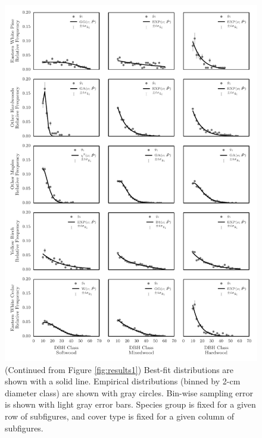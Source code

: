\documentclass{article}
\begin{document}
\begin{figure}[h!]%
  \centering
  \includegraphics[width=1.0\textwidth]{images/pspdistfit_fitplot1}
  \caption{(Continued from Figure \ref{fig:results1}) Best-fit distributions are shown with a solid
    line. Empirical distributions (binned by 2-cm diameter class) are shown with gray circles. Bin-wise sampling error is shown with light gray error bars. Species group is fixed for a given row of
    subfigures, and cover type is fixed for a given column of subfigures.}
  \label{fig:results2}
\end{figure}
\end{document}

